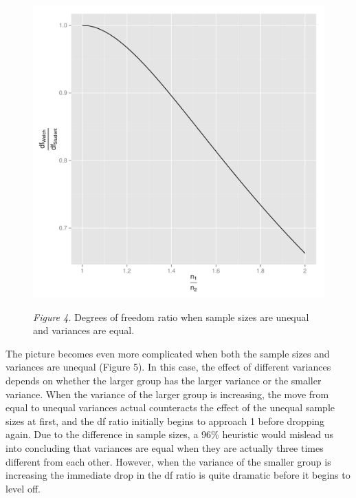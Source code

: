 \documentclass[man,a4paper,noextraspace,apacite]{apa6}\usepackage[]{graphicx}\usepackage[]{color}
\makeatletter
\def\maxwidth{ %
  \ifdim\Gin@nat@width>\linewidth
    \linewidth
  \else
    \Gin@nat@width
  \fi
}
\newenvironment{knitrout}{}{} %
\makeatother
\begin{document}
\begin{figure}
\begin{knitrout}
\color{fgcolor}
\includegraphics[width=\maxwidth]{figure/dfratiosDiffNratios} 

\end{knitrout}
\textit{Figure 4.} Degrees of freedom ratio when sample sizes are unequal and variances are equal.
\end{figure}

    The picture becomes even more complicated when both the sample sizes and variances are unequal (Figure 5). In this case, the effect of different variances depends on whether the larger group has the larger variance or the smaller variance. When the variance of the larger group is increasing, the move from equal to unequal variances actual counteracts the effect of the unequal sample sizes at first, and the df ratio initially begins to approach 1 before dropping again. Due to the difference in sample sizes, a 96\% heuristic would mislead us into concluding that variances are equal when they are actually three times different from each other. However, when the variance of the smaller group is increasing the immediate drop in the df ratio is quite dramatic before it begins to level off. 
\end{document}
